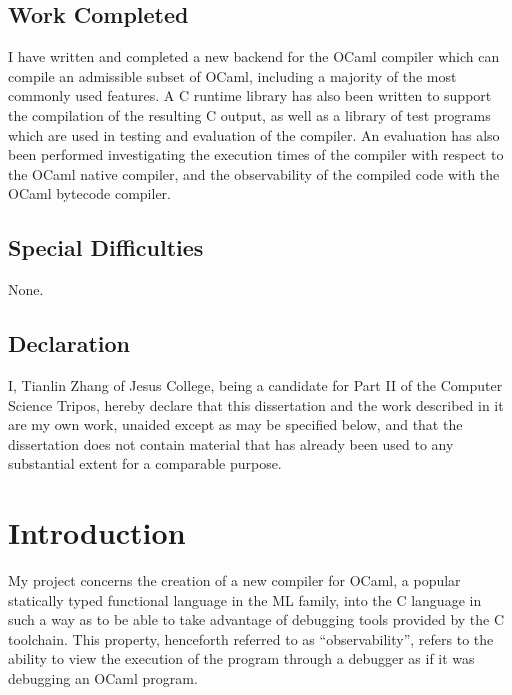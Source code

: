 \documentclass[12pt,a4paper,twoside,openright]{report}
\begin{document}
\section*{Work Completed}

I have written and completed a new backend for the OCaml compiler which can compile an admissible subset of OCaml, including a majority of the most commonly used features. A C runtime library has also been written to support the compilation of the resulting C output, as well as a library of test programs which are used in testing and evaluation of the compiler. An evaluation has also been performed investigating the execution times of the compiler with respect to the OCaml native compiler, and the observability of the compiled code with the OCaml bytecode compiler.

\section*{Special Difficulties}

None.
 
\newpage
\section*{Declaration}

I, Tianlin Zhang of Jesus College, being a candidate for Part II of the Computer
Science Tripos, hereby declare
that this dissertation and the work described in it are my own work,
unaided except as may be specified below, and that the dissertation
does not contain material that has already been used to any substantial
extent for a comparable purpose.

\bigskip
{}

\medskip
{}

\tableofcontents


\pagestyle{headings}

\chapter{Introduction}

My project concerns the creation of a new compiler for OCaml, a popular statically typed functional language in the ML family, into the C language in such a way as to be able to take advantage of debugging tools provided by the C toolchain. This property, henceforth referred to as ``observability'', refers to the ability to view the execution of the program through a debugger as if it was debugging an OCaml program.
\end{document}
